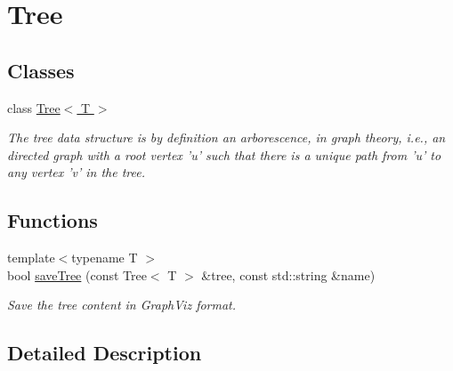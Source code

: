 \hypertarget{group___tree}{\section{Tree}
\label{group___tree}
}
\subsection*{Classes}
\begin{DoxyCompactItemize}
\item 
class \hyperlink{class_d_o_1_1_tree}{Tree$<$ T $>$}
\begin{DoxyCompactList}\small\item\em The tree data structure is by definition an arborescence, in graph theory, i.\-e., an directed graph with a root vertex 'u' such that there is a unique path from 'u' to any vertex 'v' in the tree. \end{DoxyCompactList}\end{DoxyCompactItemize}
\subsection*{Functions}
\begin{DoxyCompactItemize}
\item 
\hypertarget{group___tree_ga0fe2d80d493a2cd0387521078c7bb6af}{{\footnotesize template$<$typename T $>$ }\\bool \hyperlink{group___tree_ga0fe2d80d493a2cd0387521078c7bb6af}{save\-Tree} (const Tree$<$ T $>$ \&tree, const std\-::string \&name)}\label{group___tree_ga0fe2d80d493a2cd0387521078c7bb6af}

\begin{DoxyCompactList}\small\item\em Save the tree content in Graph\-Viz format. \end{DoxyCompactList}\end{DoxyCompactItemize}


\subsection{Detailed Description}
